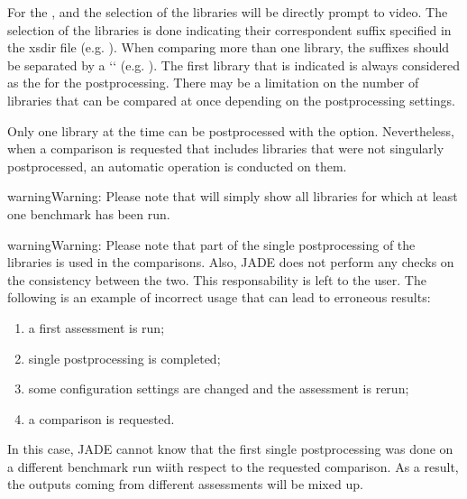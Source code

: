\documentclass[letterpaper,10pt,english]{sphinxmanual}
\begin{document}
\sphinxAtStartPar
For the ,  and  the selection of the libraries will be directly prompt to video.
The selection of the libraries is done indicating their correspondent suffix specified in the xsdir file
(e.g. ). When comparing more than one library, the suffixes should be separated by a ‘\sphinxhyphen{}‘ (e.g. ).
The first library that is indicated is always considered as the  for the post\sphinxhyphen{}processing.
There may be a limitation on the number of libraries that can be compared at once depending on the post\sphinxhyphen{}processing settings.

\sphinxAtStartPar
Only one library at the time can be post\sphinxhyphen{}processed with the  option. Nevertheless, when a comparison is requested that
includes libraries that were not singularly post\sphinxhyphen{}processed, an automatic  operation is conducted on them.

\begin{sphinxadmonition}{warning}{Warning:}
\sphinxAtStartPar
Please note that  will simply show all libraries for which at least one benchmark has been run.
\end{sphinxadmonition}

\begin{sphinxadmonition}{warning}{Warning:}
\sphinxAtStartPar
Please note that part of the single post\sphinxhyphen{}processing of the libraries is used in the comparisons. Also, JADE does not perform
any checks on the consistency between the two. This responsability is left to the user.
The following is an example of incorrect usage that can lead to erroneous results:
\begin{enumerate}
%
\item {} 
\sphinxAtStartPar
a first assessment is run;

\item {} 
\sphinxAtStartPar
single post\sphinxhyphen{}processing is completed;

\item {} 
\sphinxAtStartPar
some configuration settings are changed and the assessment is re\sphinxhyphen{}run;

\item {} 
\sphinxAtStartPar
a comparison is requested.

\end{enumerate}

\sphinxAtStartPar
In this case, JADE cannot know that the first single post\sphinxhyphen{}processing was done on a different benchmark run wiith respect
to the requested comparison. As a result, the outputs coming from different assessments will be mixed up.
\end{sphinxadmonition}
\end{document}
